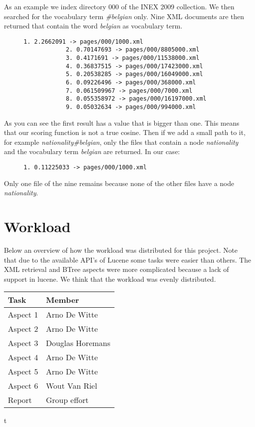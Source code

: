 \documentclass{article}
\begin{document}
As an example we index directory 000 of the INEX 2009 collection.
We then searched for the vocabulary term \emph{\#belgian} only. Nine XML documents are then returned that contain the word \emph{belgian} as vocabulary term.
\begin{figure}[H]
	\begin{minipage}{0.5\textwidth}
		\centering
		\begin{lstlisting}[basicstyle=\tiny\ttfamily, caption={High threshold}]
			1. 2.2662091 -> pages/000/1000.xml
			2. 0.70147693 -> pages/000/8805000.xml
			3. 0.4171691 -> pages/000/11538000.xml
			4. 0.36837515 -> pages/000/17423000.xml
			5. 0.20538285 -> pages/000/16049000.xml
			6. 0.09226496 -> pages/000/368000.xml
			7. 0.061509967 -> pages/000/7000.xml
			8. 0.055358972 -> pages/000/16197000.xml
			9. 0.05032634 -> pages/000/994000.xml
		\end{lstlisting}
	\end{minipage}
\end{figure}
As you can see the first result has a value that is bigger than one. This means that our scoring function is not a true cosine.
Then if we add a small path to it, for example \emph{nationality\#belgian}, only the files that contain a node \emph{nationality} and the vocabulary term \emph{belgian}
are returned.
In our case:
\begin{figure}[H]
	\begin{minipage}{0.5\textwidth}
		\centering
		\begin{lstlisting}[basicstyle=\tiny\ttfamily, caption={High threshold}]
			1. 0.11225033 -> pages/000/1000.xml
		\end{lstlisting}
	\end{minipage}
\end{figure}
Only one file of the nine remains because none of the other files have a node \emph{nationality}.

\section{Workload}
Below an overview of how the workload was distributed for this project. Note that due to the available API's of Lucene some tasks were easier than others. The XML retrieval and BTree aspects were more complicated because a lack of support in lucene. We think that the workload was evenly distributed.

\begin{center}
	\begin{tabular}{ | l | l |}
		\hline
		\textbf{Task} & \textbf{Member}  \\ \hline
		Aspect 1      & Arno De Witte    \\ \hline
		Aspect 2      & Arno De Witte    \\ \hline
		Aspect 3      & Douglas Horemans \\ \hline
		Aspect 4      & Arno De Witte    \\ \hline
		Aspect 5      & Arno De Witte    \\ \hline
		Aspect 6      & Wout Van Riel    \\ \hline
		Report        & Group effort     \\ \hline
	\end{tabular}
\end{center}t
\end{document}
